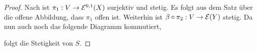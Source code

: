 \begin{proof}
  Nach \cite[Kor. 14.16]{For} ist $\pi_1: V \rightarrow \mathcal{E}^{0,1}(X)$
  surjektiv und stetig. Es folgt aus dem Satz über die offene
  Abbildung, dass $\pi_1$ offen ist.
  Weiterhin ist $\beta \circ \pi_2 : V \rightarrow \mathcal{E}(Y)$ stetig. Da nun
  auch noch das folgende Diagramm kommutiert,
  \begin{center}
  \end{center}
  folgt die Stetigkeit von $S$.


\end{proof}
